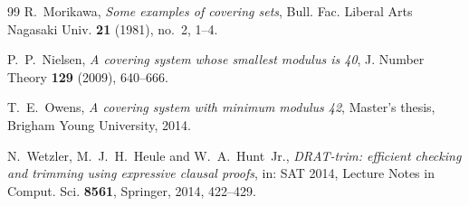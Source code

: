 \documentclass[11pt]{amsart}
\theoremstyle{definition}
\theoremstyle{remark}
\begin{document}
\begin{thebibliography}{99}
 R.~Morikawa, \emph{Some examples of covering sets}, Bull. Fac. Liberal Arts Nagasaki Univ.
\textbf{21} (1981), no.~2, 1--4.

 P.~P.~Nielsen, \emph{A covering system whose smallest modulus is 40}, J. Number Theory
\textbf{129} (2009), 640--666.

 T.~E.~Owens, \emph{A covering system with minimum modulus 42}, Master's thesis, Brigham Young
University, 2014.

 N.~Wetzler, M.~J.~H.~Heule and W.~A.~Hunt~Jr., \emph{DRAT-trim: efficient checking and trimming
using expressive clausal proofs}, in: SAT 2014, Lecture Notes in Comput. Sci. \textbf{8561}, Springer, 2014,
422--429.

\end{thebibliography}
\end{document}
